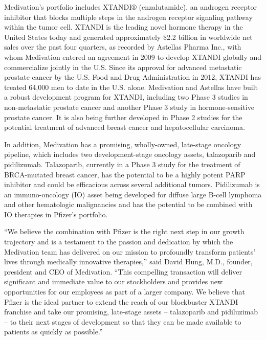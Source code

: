 \documentclass[letterpaper,12pt,english]{sphinxmanual}
\begin{document}
Medivation’s portfolio includes XTANDI® (enzalutamide), an androgen receptor inhibitor that blocks multiple steps in the androgen receptor signaling pathway within the tumor cell. XTANDI is the leading novel hormone therapy in the United States today and generated approximately \$2.2 billion in worldwide net sales over the past four quarters, as recorded by Astellas Pharma Inc., with whom Medivation entered an agreement in 2009 to develop XTANDI globally and commercialize jointly in the U.S. Since its approval for advanced metastatic prostate cancer by the U.S. Food and Drug Administration in 2012, XTANDI has treated 64,000 men to date in the U.S. alone. Medivation and Astellas have built a robust development program for XTANDI, including two Phase 3 studies in non-metastatic prostate cancer and another Phase 3 study in hormone-sensitive prostate cancer. It is also being further developed in Phase 2 studies for the potential treatment of advanced breast cancer and hepatocellular carcinoma.

In addition, Medivation has a promising, wholly-owned, late-stage oncology pipeline, which includes two development-stage oncology assets, talazoparib and pidilizumab. Talazoparib, currently in a Phase 3 study for the treatment of BRCA-mutated breast cancer, has the potential to be a highly potent PARP inhibitor and could be efficacious across several additional tumors. Pidilizumab is an immuno-oncology (IO) asset being developed for diffuse large B-cell lymphoma and other hematologic malignancies and has the potential to be combined with IO therapies in Pfizer’s portfolio.

“We believe the combination with Pfizer is the right next step in our growth trajectory and is a testament to the passion and dedication by which the Medivation team has delivered on our mission to profoundly transform patients’ lives through medically innovative therapies,” said David Hung, M.D., founder, president and CEO of Medivation. “This compelling transaction will deliver significant and immediate value to our stockholders and provides new opportunities for our employees as part of a larger company. We believe that Pfizer is the ideal partner to extend the reach of our blockbuster XTANDI franchise and take our promising, late-stage assets – talazoparib and pidiluzimab – to their next stages of development so that they can be made available to patients as quickly as possible.”
\end{document}

